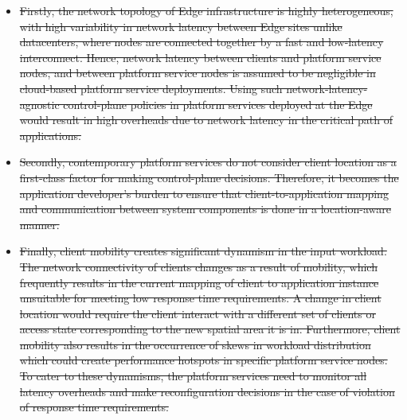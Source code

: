 \begin{itemize}
    \item \sout{Firstly, the network topology of Edge infrastructure is highly heterogeneous, with high variability in network latency between Edge sites   unlike datacenters, where nodes are connected together by a fast and low-latency interconnect. Hence, network latency between clients and platform service nodes, and between platform service nodes is assumed to be negligible in cloud-based platform service deployments. Using such network-latency-agnostic control-plane policies in platform services deployed at the Edge would result in high overheads due to network latency in the critical path of applications.}
    \item \sout{Secondly, contemporary platform services do not consider client location as a first-class factor for making control-plane decisions. Therefore, it becomes the application developer's burden to ensure that client-to-application mapping and communication between system components is done in a location-aware manner.}
    \item \sout{Finally, client mobility creates significant dynamism in the input workload. The network connectivity of clients changes as a result of mobility, which frequently results in the current mapping of client to application instance unsuitable for meeting low response time requirements. A change in client location would require the client interact with a different set of clients or access state corresponding to the new spatial area it is in. Furthermore, client mobility also results in the occurrence of skews in workload distribution which could create performance hotspots in specific platform service nodes. To cater to these dynamisms, the platform services need to monitor all latency overheads and make reconfiguration decisions in the case of violation of response time requirements.}
\end{itemize}


